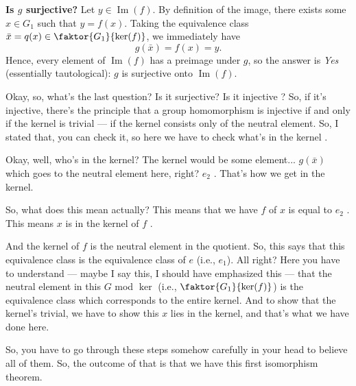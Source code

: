 \begin{proofWrapper}
\begin{content}
\textbf{Is $g$ surjective?} Let $y \in \operatorname{Im}(f)$. By definition of the image, there exists some $x \in G_1$ such that $y = f(x)$. Taking the equivalence class $\bar{x} = q(x) \in \faktor{G_1}{\ker(f)}$, we immediately have
\begin{equation}\label{eq:first-isom-surj}
g(\bar{x}) = f(x) = y.
\end{equation}
Hence, every element of $\operatorname{Im}(f)$ has a preimage under $g$, so the answer is \emph{Yes} (essentially tautological): $g$ is surjective onto $\operatorname{Im}(f)$.
\end{content}

\begin{speech}[00:08:52 - 00:11:02]
Okay, so, what's the last question? Is it surjective? Is it injective ? So, if it's injective, there's the principle that a group homomorphism is injective if and only if the kernel is trivial --- if the kernel consists only of the neutral element. So, I stated that, you can check it, so here we have to check what's in the kernel .

Okay, well, who's in the kernel? The kernel would be some element... $g(\bar{x})$ which goes to the neutral element here, right? $e_2$ . That's how we get in the kernel.

So, what does this mean actually? This means that we have $f$ of $x$ is equal to $e_2$ . This means $x$ is in the kernel of $f$ .

And the kernel of $f$ is the neutral element in the quotient. So, this says that this equivalence class is the equivalence class of $e$ (i.e., $e_1$). All right? Here you have to understand --- maybe I say this, I should have emphasized this --- that the neutral element in this $G$ mod $\ker$ (i.e., $\faktor{G_1}{\ker(f)}$) is the equivalence class which corresponds to the entire kernel. And to show that the kernel's trivial, we have to show this $x$ lies in the kernel, and that's what we have done here.

So, you have to go through these steps somehow carefully in your head to believe all of them. So, the outcome of that is that we have this first isomorphism theorem.
\end{speech}


\end{proofWrapper}
